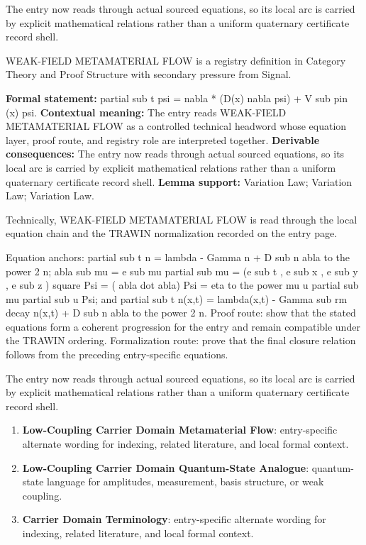 The entry now reads through actual sourced equations, so its local arc is carried by explicit mathematical relations rather than a uniform quaternary certificate record shell.
\clearpage


\begingroup\small
{}
WEAK-FIELD METAMATERIAL FLOW is a registry definition in Category Theory and Proof Structure with secondary pressure from Signal.

\begingroup\footnotesize\setlength{\emergencystretch}{3em}\sloppy
\textbf{Formal statement:} partial sub t psi = nabla * (D(x) nabla psi) + V sub pin (x) psi. \textbf{Contextual meaning:} The entry reads WEAK-FIELD METAMATERIAL FLOW as a controlled technical headword whose equation layer, proof route, and registry role are interpreted together. \textbf{Derivable consequences:} The entry now reads through actual sourced equations, so its local arc is carried by explicit mathematical relations rather than a uniform quaternary certificate record shell. \textbf{Lemma support:} Variation Law; Variation Law; Variation Law.\par
\endgroup

Technically, WEAK-FIELD METAMATERIAL FLOW is read through the local equation chain and the TRAWIN normalization recorded on the entry page.

Equation anchors: partial sub t n = lambda - Gamma n + D sub n abla to the power 2 n; abla sub mu = e sub mu partial sub mu = (e sub t , e sub x , e sub y , e sub z ) square Psi = ( abla dot abla) Psi = eta to the power mu u partial sub mu partial sub u Psi; and partial sub t n(x,t) = lambda(x,t) - Gamma sub rm decay n(x,t) + D sub n abla to the power 2 n. Proof route: show that the stated equations form a coherent progression for the entry and remain compatible under the TRAWIN ordering. Formalization route: prove that the final closure relation follows from the preceding entry-specific equations.

The entry now reads through actual sourced equations, so its local arc is carried by explicit mathematical relations rather than a uniform quaternary certificate record shell.
\endgroup

\begin{enumerate}[leftmargin=1.6em,itemsep=6pt,topsep=4pt]
\item \textbf{Low-Coupling Carrier Domain Metamaterial Flow}: entry-specific alternate wording for indexing, related literature, and local formal context.
\item \textbf{Low-Coupling Carrier Domain Quantum-State Analogue}: quantum-state language for amplitudes, measurement, basis structure, or weak coupling.
\item \textbf{Carrier Domain Terminology}: entry-specific alternate wording for indexing, related literature, and local formal context.
\end{enumerate}

